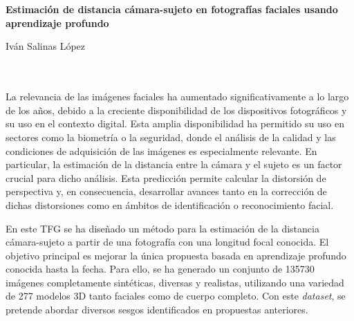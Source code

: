 \chapter*{}
\thispagestyle{empty}


\vspace*{-3cm}

\begin{center}
{\large\bfseries Estimación de distancia cámara-sujeto en fotografías faciales usando aprendizaje profundo}\\
\end{center}
\begin{center}
Iván Salinas López\\
\end{center}

\\

\vspace{0.7cm}
\\

La relevancia de las imágenes faciales ha aumentado significativamente a lo largo de los años, debido a la creciente disponibilidad de los dispositivos fotográficos y su uso en el contexto digital. Esta amplia disponibilidad ha permitido su uso en sectores como la biometría o la seguridad, donde el análisis de la calidad y las condiciones de adquisición de las imágenes es especialmente relevante. En particular, la estimación de la distancia entre la cámara y el sujeto es un factor crucial para dicho análisis. Esta predicción permite calcular la distorsión de perspectiva y, en consecuencia, desarrollar avances tanto en la corrección de dichas distorsiones como en ámbitos de identificación o reconocimiento facial.

En este TFG se ha diseñado un método para la estimación de la distancia cámara-sujeto a partir de una fotografía con una longitud focal conocida. El objetivo principal es mejorar la única propuesta basada en aprendizaje profundo conocida hasta la fecha. Para ello, se ha generado un conjunto de 135730 imágenes completamente sintéticas, diversas y realistas, utilizando una variedad de 277 modelos 3D tanto faciales como de cuerpo completo. Con este \textit{dataset}, se pretende abordar diversos sesgos identificados en propuestas anteriores.

